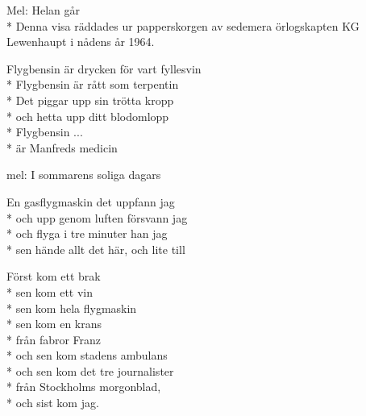 
\pagestyle{Flygarsånger}


\begin{SongText}
    \begin{SongInfo}
        Mel: Helan går\\*%
        Denna visa räddades ur papperskorgen av sedemera örlogskapten KG Lewenhaupt i nådens år 1964.
    \end{SongInfo}
    \begin{SongVerse}
        Flygbensin är drycken för vart fyllesvin\\*%
        Flygbensin är rått som terpentin\\*%
        Det piggar upp sin trötta kropp\\*%
        och hetta upp ditt blodomlopp\\*%
        Flygbensin ...\\*%
        är Manfreds medicin
    \end{SongVerse}
\end{SongText}
\begin{SongText}[Gasflygmaskinen]
    \begin{SongInfo}
        mel: I sommarens soliga dagars
    \end{SongInfo}
    \begin{SongVerse}
        En gasflygmaskin det uppfann jag\\*%
        och upp genom luften försvann jag\\*%
        och flyga i tre minuter han jag\\*%
        sen hände allt det här, och lite till
    \end{SongVerse}
    \begin{SongVerse}
        Först kom ett brak\\*%
        sen kom ett vin\\*%
        sen kom hela flygmaskin\\*%
        sen kom en krans\\*%
        från fabror Franz\\*%
        och sen kom stadens ambulans\\*%
        och sen kom det tre journalister\\*%
        från Stockholms morgonblad,\\*%
        och sist kom jag.
    \end{SongVerse}
\end{SongText}
